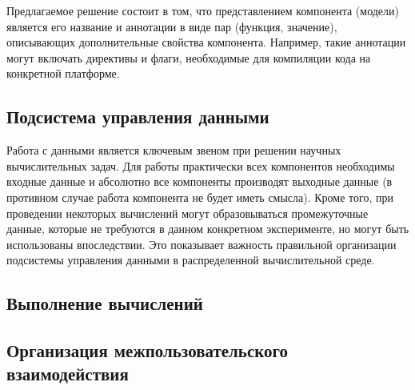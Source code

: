 Предлагаемое решение состоит в том, что представлением компонента (модели) является его название и аннотации в виде пар (функция, значение), описывающих дополнительные свойства компонента. Например, такие аннотации могут включать директивы и флаги, необходимые для компиляции кода на конкретной платформе. 

\subsection{Подсистема управления данными}

Работа с данными является ключевым звеном при решении научных вычислительных задач. Для работы практически всех компонентов необходимы входные данные и абсолютно все компоненты производят выходные данные (в противном случае работа компонента не будет иметь смысла). Кроме того, при проведении некоторых вычислений могут образовываться промежуточные данные, которые не требуются в данном конкретном эксперименте, но могут быть использованы впоследствии. Это показывает важность правильной организации подсистемы управления данными в распределенной вычислительной среде.

 

\subsection{Выполнение вычислений}

\subsection{Организация межпользовательского взаимодействия}